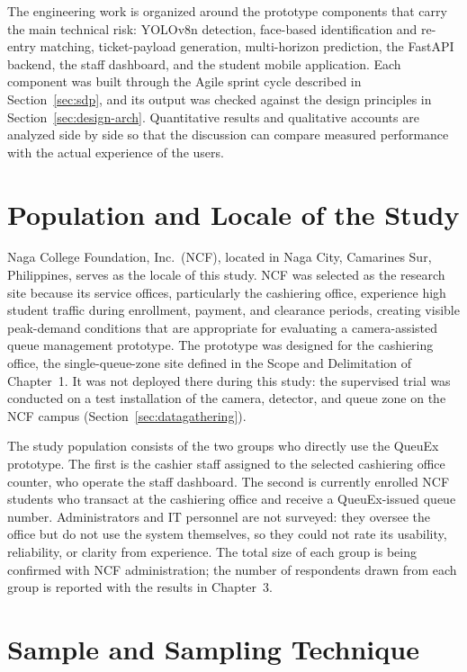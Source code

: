 \documentclass{research}
\newcommand{\sysname}{QueuEx}
\begin{document}
The engineering work is organized around the prototype components that
carry the main technical risk: YOLOv8n detection, face-based
identification and re-entry matching, ticket-payload generation,
multi-horizon prediction, the FastAPI backend, the staff dashboard, and
the student mobile application. Each component was built through the
Agile sprint cycle described in Section~\ref{sec:sdp}, and its output
was checked against the design principles in
Section~\ref{sec:design-arch}. Quantitative results and qualitative
accounts are analyzed side by side so that the discussion can compare
measured performance with the actual experience of the users.

\section{Population and Locale of the Study}
\label{cr:population}

Naga College Foundation, Inc.\ (NCF), located in Naga City, Camarines
Sur, Philippines, serves as the locale of this study. NCF was selected
as the research site because its service offices, particularly the
cashiering office, experience high student traffic during enrollment,
payment, and clearance periods, creating visible peak-demand conditions
that are appropriate for evaluating a camera-assisted queue management
prototype. The prototype was designed for the cashiering office, the
single-queue-zone site defined in the Scope and Delimitation of
Chapter~1. It was not deployed there during this study: the supervised
trial was conducted on a test installation of the camera, detector, and
queue zone on the NCF campus (Section~\ref{sec:datagathering}).

The study population consists of the two groups who directly use the
\sysname{} prototype. The first is the cashier staff assigned to the
selected cashiering office counter, who operate the staff dashboard. The
second is currently enrolled NCF students who transact at the cashiering
office and receive a \sysname{}-issued queue number. Administrators and
IT personnel are not surveyed: they oversee the office but do not use the
system themselves, so they could not rate its usability, reliability, or
clarity from experience. The total size of each group is being
confirmed with NCF administration; the number of respondents drawn from
each group is reported with the results in Chapter~3.

\section{Sample and Sampling Technique}
\label{cr:sampling}
\end{document}
